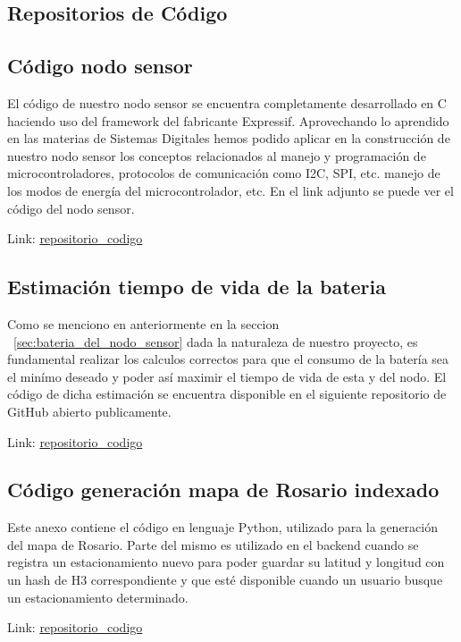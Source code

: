 \clearpage

\begin{appendixd}
    \section{Repositorios de Código}
        \subsection{Código nodo sensor}{\label{codigo_sensor}}
            El código de nuestro nodo sensor se encuentra completamente desarrollado en C haciendo uso del framework del fabricante
            Expressif. Aprovechando lo aprendido en las materias de Sistemas Digitales hemos podido aplicar en la construcción de nuestro
            nodo sensor los conceptos relacionados al manejo y programación de microcontroladores, protocolos de comunicación como I2C, SPI, etc.
            manejo de los modos de energía del microcontrolador, etc. En el link adjunto se puede ver el código del nodo sensor.


            Link: \url{repositorio_codigo}

        \subsection{Estimación tiempo de vida de la bateria}{\label{codigo_estimacion_bateria}}
            Como se menciono en anteriormente en la seccion ~\ref{sec:bateria_del_nodo_sensor} dada la naturaleza de nuestro
            proyecto, es fundamental realizar los calculos correctos para que el consumo de la batería sea el minímo deseado 
            y poder así maximir el tiempo de vida de esta y del nodo. El código de dicha estimación se encuentra disponible
            en el siguiente repositorio de GitHub abierto publicamente.

            Link: \url{repositorio_codigo}


        \subsection{Código generación mapa de Rosario indexado}
            Este anexo contiene el código en lenguaje Python, utilizado para la generación del mapa de Rosario. 
            Parte del mismo es utilizado en el backend cuando se registra un estacionamiento nuevo para poder guardar su latitud y 
            longitud con un hash de H3 correspondiente y que esté disponible cuando un usuario busque un estacionamiento determinado.

            Link: \url{repositorio_codigo}

\end{appendixd}
